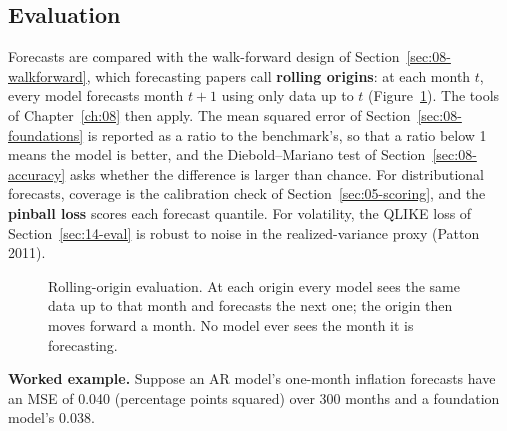 \subsection{Evaluation}

Forecasts are compared with the walk-forward design of Section~\ref{sec:08-walkforward}, which forecasting papers call \textbf{rolling origins}: at each month $t$, every model forecasts month $t+1$ using only data up to $t$ (Figure~\ref{fig:21-rolling}). The tools of Chapter~\ref{ch:08} then apply. The mean squared error of Section~\ref{sec:08-foundations} is reported as a ratio to the benchmark's, so that a ratio below 1 means the model is better, and the Diebold--Mariano test of Section~\ref{sec:08-accuracy} asks whether the difference is larger than chance. For distributional forecasts, coverage is the calibration check of Section~\ref{sec:05-scoring}, and the \textbf{pinball loss} scores each forecast quantile. For volatility, the QLIKE loss of Section~\ref{sec:14-eval} is robust to noise in the realized-variance proxy (Patton 2011).

\begin{figure}[htbp]
\centering
{}
\caption{Rolling-origin evaluation. At each origin every model sees the same data up to that month and forecasts the next one; the origin then moves forward a month. No model ever sees the month it is forecasting.}
\label{fig:21-rolling}
\end{figure}

\textbf{Worked example.} Suppose an AR model's one-month inflation forecasts have an MSE of 0.040 (percentage points squared) over 300 months and a foundation model's 0.038.

